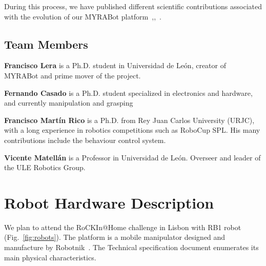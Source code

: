 \documentclass[conference]{IEEEtran}
\begin{document}
During this process, we have published different scientific contributions associated with the evolution of our MYRABot platform~\cite{lera2014mobile},\cite{martin2014myrabot},~\cite{lera2014building}.




\subsection{Team Members}

\textbf{Francisco Lera} is a Ph.D. student in Universidad de Le\'on, creator of MYRABot and prime mover of the project. 

\textbf{Fernando Casado} is a Ph.D. student specialized in electronics and hardware, and currently manipulation and grasping

\textbf{Francisco Mart\'in Rico} is a Ph.D. from Rey Juan Carlos University (URJC), with a long experience in robotics competitions such as RoboCup SPL. His many
contributions include the behaviour  control system.

\textbf{Vicente Matell\'an} is a Professor in Universidad de Le\'on. Overseer and leader of the ULE Robotics Group.


\section{Robot Hardware Description}
\label{sec:hardwaredescription}

We plan to attend the RoCKIn@Home challenge in  Lisbon  with  RB1  robot (Fig.~\ref{fig:robots}). 
The platform is a mobile manipulator designed and manufacture by Robotnik~\cite{Robotnik2015,IEEESpectrum2015}. 
The Technical specification document\cite{TechnicalRobotnik2015} enumerates its main physical characteristics.


% 
\end{document}

